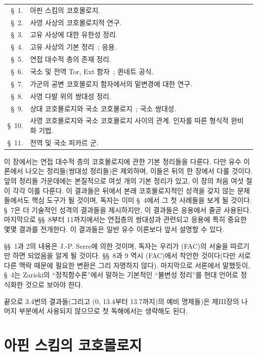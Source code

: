 \medskip
\begin{tabular}{@{}r@{\ }p{}@{}}
\S~1. & 아핀 스킴의 코호몰로지.\\
\S~2. & 사영 사상의 코호몰로지적 연구.\\
\S~3. & 고유 사상에 대한 유한성 정리.\\
\S~4. & 고유 사상의 기본 정리~; 응용.\\
\S~5. & 연접 대수적 층의 존재 정리.\\
\S~6. & 국소 및 전역 Tor, Ext 함자~; 퀸네트 공식.\\
\S~7. & 가군의 공변 코호몰로지 함자에서의 밑변경에 대한
연구.\\
\S~8. & 사영 다발 위의 쌍대성 정리.\\
\S~9. & 상대 코호몰로지와 국소 코호몰로지~; 국소 쌍대성.\\
\S~10. & 사영 코호몰로지와 국소 코호몰로지 사이의 관계.
인자를 따른 형식적 완비화 기법.\\
\S~11. & 전역 및 국소 피카르 군\footnotemark.
\end{tabular}

\medskip
이 장에서는 연접 대수적 층의 코호몰로지에 관한 기본 정리들을 다룬다.
다만 유수 이론에서 나오는 정리들(쌍대성 정리들)은 제외하며, 이들은 뒤의
한 장에서 다룰 것이다. 앞의 정리들 가운데에는 본질적으로 여섯 개의 기본
정리가 있고, 이 장의 처음 여섯 절이 각각 이를 다룬다. 이 결과들은 뒤에서
본래 코호몰로지적인 성격을 갖지 않는 문제들에서도 핵심 도구가 될 것이며,
독자는 이미 \S~4에서 그 첫 사례들을 보게 될 것이다. \S~7은 더 기술적인
성격의 결과들을 제시하지만, 이 결과들은 응용에서 줄곧 사용된다. 마지막으로
\S\S~8부터 11까지에서는 연접층의 쌍대성과 관련되고 응용에 특히 중요한 몇몇
결과를 전개한다. 이 결과들은 일반 유수 이론보다 앞서 설명할 수 있다.


\S\S~1과 2의 내용은 J.-P. Serre에 의한 것이며, 독자는 우리가 (FAC)의
서술을 따르기만 하면 되었음을 알게 될 것이다. \S\S~8과 9 역시 (FAC)에서
착안한 것이다(다만 서로 다른 맥락 때문에 필요한 변환은 그리 자명하지 않다).
마지막으로 서론에서 말했듯이, \S~4는 Zariski의 ``정칙함수론''에서 말하는
기본적인 ``불변성 정리''를 현대 언어로 정식화한 것으로 보아야 한다.

끝으로 3.4번의 결과들(그리고 (0, 13.4부터 13.7까지)의 예비 명제들)은
제III장의 나머지 부분에서 사용되지 않으므로 첫 독해에서는 생략해도 된다.

\setcounter{section}{0}
\section{아핀 스킴의 코호몰로지}
\label{section:III.1-fr}

